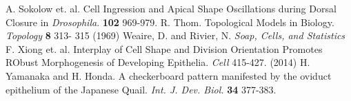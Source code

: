 \begin{thebibliography}{1}
 A. Sokolow et. al. Cell Ingression and Apical Shape Oscillations during Dorsal Closure in \emph{Drosophila}. \textbf{102} 969-979.
 R. Thom. Topological Models in Biology. \emph{Topology} \textbf{8} 313- 315 (1969)
 Weaire, D. and Rivier, N. \emph{Soap, Cells, and Statistics}
 F. Xiong et. al. Interplay of Cell Shape and Division Orientation Promotes RObust Morphogenesis of Developing Epithelia. \emph{Cell}  415-427. (2014)
 H. Yamanaka and H. Honda. A checkerboard pattern manifested by the oviduct epithelium of the Japanese Quail. \emph{Int. J. Dev. Biol.} \textbf{34} 377-383.
\end{thebibliography}


